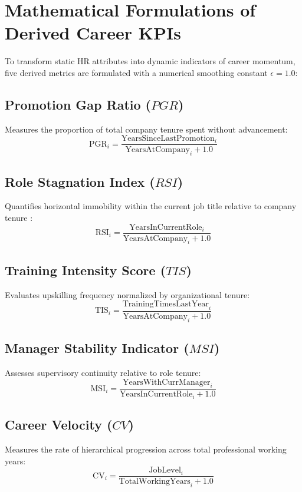 \documentclass[12pt,a4paper,oneside]{report}
\begin{document}
\section{Mathematical Formulations of Derived Career KPIs}
To transform static HR attributes into dynamic indicators of career momentum, five derived metrics are formulated with a numerical smoothing constant $\epsilon = 1.0$:

\subsection{Promotion Gap Ratio ($PGR$)}
Measures the proportion of total company tenure spent without advancement:
\begin{equation}
\text{PGR}_i = \frac{\text{YearsSinceLastPromotion}_i}{\text{YearsAtCompany}_i + 1.0}
\end{equation}

\subsection{Role Stagnation Index ($RSI$)}
Quantifies horizontal immobility within the current job title relative to company tenure \cite{ref_campion_rotation}:
\begin{equation}
\text{RSI}_i = \frac{\text{YearsInCurrentRole}_i}{\text{YearsAtCompany}_i + 1.0}
\end{equation}

\subsection{Training Intensity Score ($TIS$)}
Evaluates upskilling frequency normalized by organizational tenure:
\begin{equation}
\text{TIS}_i = \frac{\text{TrainingTimesLastYear}_i}{\text{YearsAtCompany}_i + 1.0}
\end{equation}

\subsection{Manager Stability Indicator ($MSI$)}
Assesses supervisory continuity relative to role tenure:
\begin{equation}
\text{MSI}_i = \frac{\text{YearsWithCurrManager}_i}{\text{YearsInCurrentRole}_i + 1.0}
\end{equation}

\subsection{Career Velocity ($CV$)}
Measures the rate of hierarchical progression across total professional working years:
\begin{equation}
\text{CV}_i = \frac{\text{JobLevel}_i}{\text{TotalWorkingYears}_i + 1.0}
\end{equation}
\end{document}

